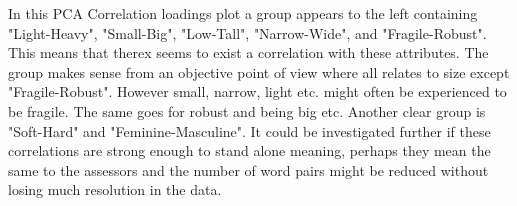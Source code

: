 In this PCA Correlation loadings plot a group appears to the left containing "Light-Heavy", "Small-Big",  "Low-Tall", "Narrow-Wide", and "Fragile-Robust". This means that therex seems to exist a correlation with these attributes. The group makes sense from an objective point of view where all relates to size except "Fragile-Robust". However small, narrow, light etc. might often be experienced to be fragile. The same goes for robust and being big etc. Another clear group is "Soft-Hard" and "Feminine-Masculine". It could be investigated further if these correlations are strong enough to stand alone meaning, perhaps they mean the same to the assessors and the number of word pairs might be reduced without losing much resolution in the data.